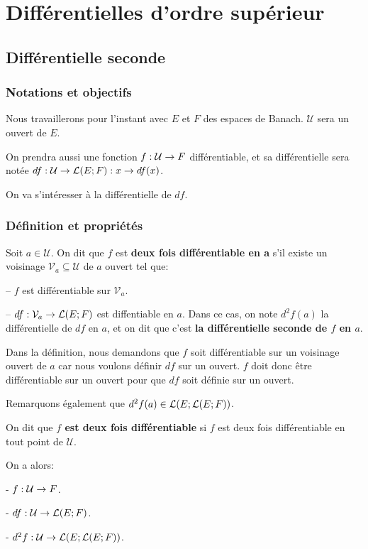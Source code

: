 \chapter{Différentielles d'ordre supérieur}

\section{Différentielle seconde}

\subsection*{Notations et objectifs}
Nous travaillerons pour l'instant avec $E$ et $F$ des espaces de Banach.
$\mathcal{U}$ sera un ouvert de $E$.

On prendra aussi une fonction $f : \mathcal{U} \rightarrow F$ différentiable, et
sa différentielle sera notée
$df : \mathcal{U} \rightarrow \mathcal{L}(E; F) : x \rightarrow df(x)$.

On va s'intéresser à la différentielle de $df$.

\subsection{Définition et propriétés}

\begin{definition}
	Soit $a \in \mathcal{U}$. On dit que $f$ est \textbf{deux fois
	différentiable en a} s'il existe un voisinage $\mathcal{V}_{a} \subseteq
	\mathcal{U}$ de $a$ ouvert tel que:

	-- $f$ est différentiable sur $\mathcal{V}_{a}$.

	-- $df : \mathcal{V}_{a} \rightarrow \mathcal{L}(E; F)$ est diffentiable
	en $a$.
	Dans ce cas, on note $d^{2}f(a)$ la différentielle de $df$ en $a$, et on dit
	que c'est \textbf{la différentielle seconde de $f$ en $a$}.
\end{definition}

Dans la définition, nous demandons que $f$ soit différentiable sur un
voisinage ouvert de $a$ car nous voulons définir $df$ sur un ouvert. $f$ doit
donc être différentiable sur un ouvert pour que $df$ soit définie sur un ouvert.

Remarquons également que $d^{2}f(a) \in
\mathcal{L}(E; \mathcal{L}(E; F))$.

\begin{definition}
	On dit que \textbf{$f$ est deux fois différentiable} si $f$ est deux fois
	différentiable en tout point de $\mathcal{U}$.

	On a alors:

	- $f : \mathcal{U} \rightarrow F$.

	- $df : \mathcal{U} \rightarrow \mathcal{L}(E; F)$.

	- $d^{2}f : \mathcal{U} \rightarrow \mathcal{L}(E; \mathcal{L}(E; F))$.
\end{definition}

